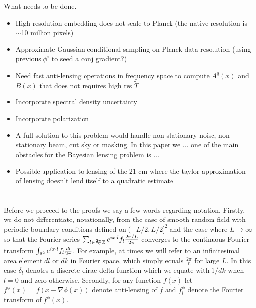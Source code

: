 \documentclass[noinfoline]{imsart}
\begin{document}
What needs to be done.
\begin{itemize}
 \item High resolution embedding does not scale to Planck (the native resolution is $\sim$10 million pixels)
\item Approximate Gaussian conditional sampling on Planck data resolution (using previous $\phi^{i}$ to seed a conj gradient?)
\item Need fast anti-lensing operations in frequency space to compute $A^q(x)$ and $B(x)$ that does not requires high res $\tilde T$
\item Incorporate spectral density uncertainty
\item Incorporate polarization
\item A full solution to this problem would handle non-stationary noise, non-stationary beam, cut sky or masking, In this paper we ... one of the main obstacles for the Bayesian lensing problem is ...
\item Possible application to lensing of the 21 cm where the taylor approximation of lensing doesn't lend itself to a quadratic estimate
\end{itemize}










%
%
\appendix

\section{}

Before we proceed to the proofs we say a few words regarding notation.
Firstly, we do not differentiate, notationally, from the case of smooth random field with periodic boundary conditions defined on $(-L/2, L/2]^2$ and the case where $L\rightarrow \infty$ so that the Fourier series $\sum_{l \in \frac{2\pi}{L}\Bbb Z }   e^{i x\cdot l}  f_l \frac{2\pi/ L}{2\pi} $ converges to the continuous Fourier transform $\int_{\Bbb R^2}  e^{i x\cdot l}  f_l \frac{dl}{2\pi} $. %
For example, at times we will refer to an infinitesimal area element $dl$ or $dk$ in Fourier space, which simply equals $\frac{2\pi}{L}$ for large $L$. In this case $\delta_l$ denotes a discrete dirac delta function which we equate with $1/dk$ when $l=0$ and zero otherwise. 
Secondly, for any function $f(x)$ let $f^\phi(x) = f(x-\nabla \phi(x))$ denote anti-lensing of $f$ and $f^\phi_l$ denote the Fourier transform of  $f^\phi(x)$.
\end{document}
